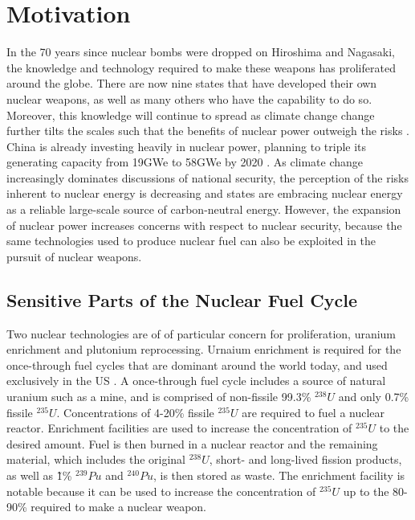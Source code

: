 \section{Motivation}
\label{s_motive}

In the 70 years since nuclear bombs were dropped on Hiroshima and Nagasaki, the knowledge and technology required to make these weapons has proliferated around the globe. There are now nine states that have developed their own nuclear weapons, as well as many others who have the capability to do so\cite{feiveson_unmaking_2014}.  Moreover, this knowledge will continue to spread as climate change change further tilts the scales such that the benefits of nuclear power outweigh the risks \cite{mooney_why_2014}.  China is already investing heavily in nuclear power, planning to triple its generating capacity from 19GWe to 58GWe by 2020  \cite{world_China_2014}.  As climate change increasingly dominates discussions of national security, the perception of the risks inherent to nuclear energy is decreasing and states are embracing nuclear energy as a reliable large-scale source of carbon-neutral energy.  However, the expansion of nuclear power increases concerns with respect to nuclear security, because the same technologies used to produce nuclear fuel can also be exploited in the pursuit of nuclear weapons.


\subsection{Sensitive Parts of the Nuclear Fuel Cycle}

Two nuclear technologies are of of particular concern for proliferation, uranium enrichment and plutonium reprocessing.  Urnaium enrichment is required for the once-through fuel cycles that are dominant around the world today, and used exclusively in the US \cite{rossin_nuclear_??}.  A once-through fuel cycle includes a source of natural uranium such as a mine, and is comprised of non-fissile 99.3\% $^{238}U$ and only 0.7\% fissile $^{235}U$. Concentrations of 4-20\% fissile $^{235}U$ are required to fuel a nuclear reactor. Enrichment facilities are used to increase the concentration of $^{235}U$ to the desired amount.  Fuel is then burned in a nuclear reactor and the remaining material, which includes the original $^{238}U$, short- and long-lived fission products, as well as \~1\% $^{239}Pu$ and $^{240}Pu$, is then stored as waste.  The enrichment facility is notable because it can be used to increase the concentration of $^{235}U$ up to the 80-90\% required to make a nuclear weapon\cite{weapons_grade_den}.

